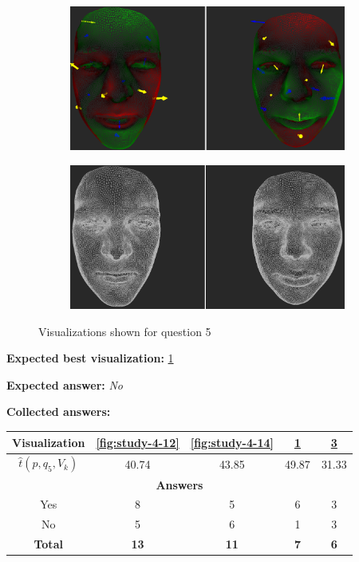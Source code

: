 \begin{figure}[h]
\begin{subfigure}{0.49\textwidth}
\includegraphics[width=\textwidth]{./img-study/pair11.PNG}
\caption{}
\label{fig:study-4-11}
\end{subfigure}
\begin{subfigure}{0.49\textwidth}
\includegraphics[width=\textwidth]{./img-study/pair13.PNG}
\caption{}
\label{fig:study-4-13}
\end{subfigure}
\caption{Visualizations shown for question 5}
\end{figure}
\medskip

{\bf Expected best visualization:} \ref{fig:study-4-11}
\medskip

{\bf Expected answer:} {\it No}
\medskip

{\bf Collected answers:}

\begin{center}
\begin{tabular}{| c | c | c | c | c |}
	\hline
	Visualization & \ref{fig:study-4-12} & \ref{fig:study-4-14} & \ref{fig:study-4-11} & \ref{fig:study-4-13}\\ \hline
	\(\widehat{t}(p, q_5, V_k)\) & 40.74 & 43.85 & 49.87 & 31.33\\ \hline
	\multicolumn{5}{|c|}{\bf Answers} \\ \hline
	Yes & 8 & 5 & 6 & 3\\ \hline
	\rowcolor{yellow!30} No & 5 & 6 & 1 & 3\\ \hline
	{\bf Total} & {\bf 13} & {\bf 11} & {\bf 7} & {\bf 6}\\ \hline
\end{tabular}
\end{center}

